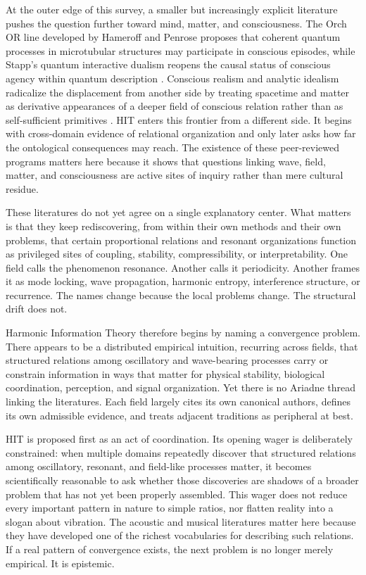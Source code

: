 At the outer edge of this survey, a smaller but increasingly explicit literature pushes the question further toward mind, matter, and consciousness. The Orch OR line developed by Hameroff and Penrose proposes that coherent quantum processes in microtubular structures may participate in conscious episodes, while Stapp's quantum interactive dualism reopens the causal status of conscious agency within quantum description \parencites{hameroff_2014}{stapp_2005}. Conscious realism and analytic idealism radicalize the displacement from another side by treating spacetime and matter as derivative appearances of a deeper field of conscious relation rather than as self-sufficient primitives \parencites{hoffman_2008}{kastrup_2017a}{kastrup_2017b}. HIT enters this frontier from a different side. It begins with cross-domain evidence of relational organization and only later asks how far the ontological consequences may reach. The existence of these peer-reviewed programs matters here because it shows that questions linking wave, field, matter, and consciousness are active sites of inquiry rather than mere cultural residue.

These literatures do not yet agree on a single explanatory center. What matters is that they keep rediscovering, from within their own methods and their own problems, that certain proportional relations and resonant organizations function as privileged sites of coupling, stability, compressibility, or interpretability. One field calls the phenomenon resonance. Another calls it periodicity. Another frames it as mode locking, wave propagation, harmonic entropy, interference structure, or recurrence. The names change because the local problems change. The structural drift does not.

Harmonic Information Theory therefore begins by naming a convergence problem. There appears to be a distributed empirical intuition, recurring across fields, that structured relations among oscillatory and wave-bearing processes carry or constrain information in ways that matter for physical stability, biological coordination, perception, and signal organization. Yet there is no Ariadne thread linking the literatures. Each field largely cites its own canonical authors, defines its own admissible evidence, and treats adjacent traditions as peripheral at best.

HIT is proposed first as an act of coordination. Its opening wager is deliberately constrained: when multiple domains repeatedly discover that structured relations among oscillatory, resonant, and field-like processes matter, it becomes scientifically reasonable to ask whether those discoveries are shadows of a broader problem that has not yet been properly assembled. This wager does not reduce every important pattern in nature to simple ratios, nor flatten reality into a slogan about vibration. The acoustic and musical literatures matter here because they have developed one of the richest vocabularies for describing such relations. If a real pattern of convergence exists, the next problem is no longer merely empirical. It is epistemic.
